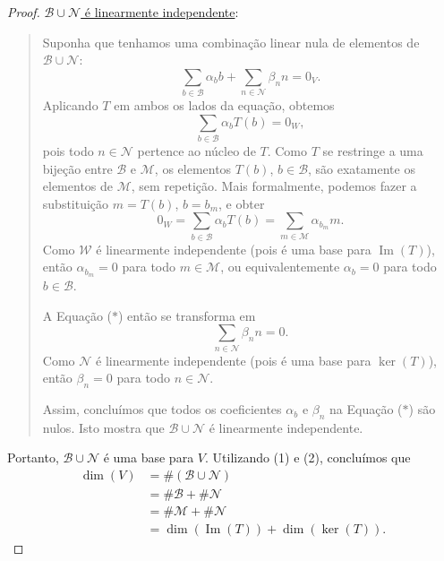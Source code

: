 \begin{proof}
	\uline{$\mathcal{B}\cup\mathcal{N}$ é linearmente independente}:
	
	\begin{quote}
		Suponha que tenhamos uma combinação linear nula de elementos de $\mathcal{B}\cup\mathcal{N}$:
		\[\sum_{b\in\mathcal{B}}\alpha_b b+\sum_{n\in\mathcal{N}}\beta_n n=0_V.\tag{$*$}\]
		Aplicando $T$ em ambos os lados da equação, obtemos
		\[\sum_{b\in\mathcal{B}}\alpha_b T(b)=0_W,\]
		pois todo $n\in\mathcal{N}$ pertence ao núcleo de $T$. Como $T$ se restringe a uma bijeção entre $\mathcal{B}$ e $\mathcal{M}$, os elementos $T(b)$, $b\in\mathcal{B}$, são exatamente os elementos de $\mathcal{M}$, sem repetição. Mais formalmente, podemos fazer a substituição $m=T(b)$, $b=b_m$, e obter
		\[0_W=\sum_{b\in\mathcal{B}}\alpha_b T(b)=\sum_{m\in\mathcal{M}}\alpha_{b_m} m.\]
		Como $\mathcal{W}$ é linearmente independente (pois é uma base para $\operatorname{Im}(T)$), então $\alpha_{b_m}=0$ para todo $m\in\mathcal{M}$, ou equivalentemente $\alpha_b=0$ para todo $b\in\mathcal{B}$.
		
		A Equação ($*$) então se transforma em
		\[\sum_{n\in\mathcal{N}}\beta_n n=0.\]
		Como $\mathcal{N}$ é linearmente independente (pois é uma base para $\ker(T)$), então $\beta_n=0$ para todo $n\in\mathcal{N}$.
		
		Assim, concluímos que todos os coeficientes $\alpha_b$ e $\beta_n$ na Equação ($*$) são nulos. Isto mostra que $\mathcal{B}\cup\mathcal{N}$ é linearmente independente.
	\end{quote}
	
	Portanto, $\mathcal{B}\cup\mathcal{N}$ é uma base para $V$. Utilizando (1) e (2), concluímos que
	\begin{align*}
	\dim(V)
		&=\#\left(\mathcal{B}\cup\mathcal{N}\right)\\
		&=\#\mathcal{B}+\#\mathcal{N}\\
		&=\#\mathcal{M}+\#\mathcal{N}\\
		&=\dim(\operatorname{Im}(T))+\dim(\ker(T)).
		\end{align*}
\end{proof}